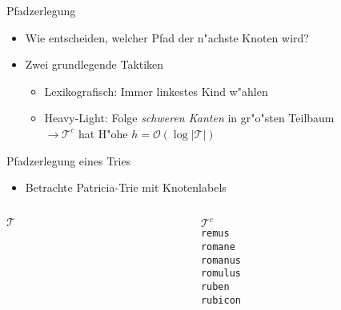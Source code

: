 \documentclass[ngerman,hyperref={pdfpagelabels=true}]{beamer}
\newcommand\T{\mathcal{T}}
\begin{document}
\begin{frame}{Pfadzerlegung}
\begin{itemize}
\item Wie entscheiden, welcher Pfad der n"achste Knoten wird?
\item Zwei grundlegende Taktiken
\begin{itemize}
\item Lexikografisch: Immer linkestes Kind w"ahlen
\item Heavy-Light: Folge \emph{schweren Kanten} in gr"o"sten Teilbaum
\\$\rightarrow \T^c$ hat H"ohe $h = \mathcal{O}(\log |\T|)$
\end{itemize}
\end{itemize}
\end{frame}

\newcommand{\edgelabel}[2]{edge from parent node[draw=none,#1]{\lstinline|#2|}}

\begin{frame}{Pfadzerlegung eines Tries}
\begin{itemize}
\item Betrachte Patricia-Trie mit Knotenlabels
\end{itemize}

\begin{columns}[T] %
\begin{column}{.48\textwidth}

\centering
$\T$ \\[1em]


\end{column}%
\hfill%
\begin{column}{.48\textwidth}

$\T^c$ \\


\lstinline|remus| \\
\lstinline|romane| \\
\lstinline|romanus| \\
\lstinline|romulus| \\
\lstinline|ruben| \\
\lstinline|rubicon| \\

\end{column}
\end{columns}

\end{frame}
\end{document}
